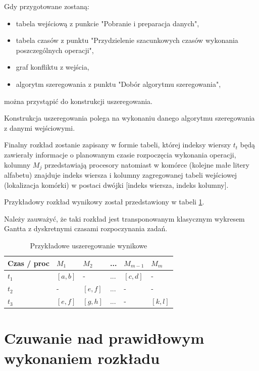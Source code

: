 \documentclass[brudnopis]{xmgr}
\begin{document}
Gdy przygotowane zostaną:

\begin{itemize}
    \item tabela wejściową z punkcie "Pobranie i preparacja danych",
    \item tabela czasów z punktu "Przydzielenie szacunkowych czasów wykonania poszczególnych operacji",
    \item graf konfliktu z wejścia,
    \item algorytm szeregowania z punktu "Dobór algorytmu szeregowania",
\end{itemize}

można przystąpić do konstrukcji uszeregowania.
\medskip

Konstrukcja uszeregowania polega na wykonaniu danego algorytmu szeregowania z danymi wejściowymi.
\medskip

Finalny rozkład zostanie zapisany w formie tabeli, której indeksy wierszy $t_t$ będą zawierały informacje o planowanym czasie rozpoczęcia wykonania operacji, kolumny $M_j$ przedstawiają procesory natomiast w komórce (kolejne małe litery alfabetu) znajduje indeks wiersza i kolumny zagregowanej tabeli wejściowej (lokalizacja komórki) w postaci dwójki [indeks wiersza, indeks kolumny].
\medskip

Przykładowy rozkład wynikowy został przedstawiony w tabeli \ref{tab:example-sched-out}.
\medskip

Należy zauważyć, że taki rozkład jest transponowanym klasycznym wykresem Gantta z dyskretnymi czasami rozpoczynania zadań.

\begin{table}[!tbh]
\begin{tabular}{|l|l|l|l|l|l|} \hline
Czas / proc & $M_1$     & $M_2$     & ...   & $M_{m-1}$ & $M_{m}$ \\ \hline
$t_1$       & $[a,b]$   & -         & ...   & $[c,d]$   & - \\ \hline
$t_2$       & -         & $[e,f]$   & ...   & -         & - \\ \hline
$t_3$       & $[e,f]$   & $[g,h]$   & ...   & -         & $[k,l]$\\ \hline
\end{tabular}
\caption{Przykładowe uszeregowanie wynikowe\label{tab:example-sched-out}}
\end{table}


\section{Czuwanie nad prawidłowym wykonaniem rozkładu}
\end{document}
